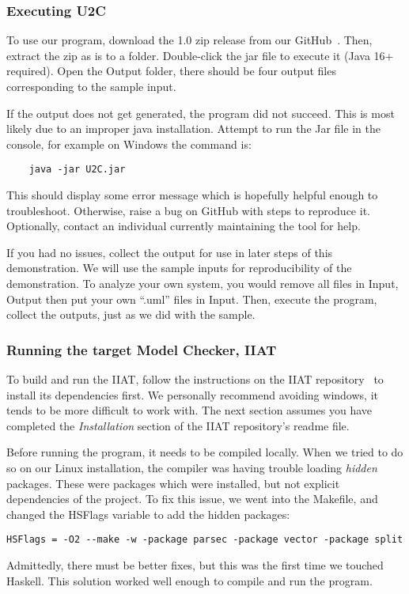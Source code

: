 \newpage
\subsubsection{Executing U2C}\label{subsubsec:exec}
To use our program, download the 1.0 zip release from our GitHub~\cite{repo_u2c}.
Then, extract the zip as is to a folder.
Double-click the jar file to execute it (Java 16+ required).
Open the Output folder, there should be four output files corresponding to the sample input.

If the output does not get generated, the program did not succeed.
This is most likely due to an improper java installation.
Attempt to run the Jar file in the console, for example on Windows the command is:
\begin{verbatim}
    java -jar U2C.jar
\end{verbatim}
This should display some error message which is hopefully helpful enough to troubleshoot.
Otherwise, raise a bug on GitHub with steps to reproduce it.
Optionally, contact an individual currently maintaining the tool for help.

If you had no issues, collect the output for use in later steps of this demonstration.
We will use the sample inputs for reproducibility of the demonstration.
To analyze your own system, you would remove all files in Input, Output then put your own ``.uml'' files in Input.
Then, execute the program, collect the outputs, just as we did with the sample.

\subsubsection{Running the target Model Checker, IIAT}\label{subsubsec:iiat-run}
To build and run the IIAT, follow the instructions on the IIAT repository~\cite{repo_iiat} to install its dependencies first.
We personally recommend avoiding windows, it tends to be more difficult to work with.
The next section assumes you have completed the \textit{Installation} section of the IIAT repository's readme file.

Before running the program, it needs to be compiled locally.
When we tried to do so on our Linux installation, the compiler was having trouble loading \textit{hidden} packages.
These were packages which were installed, but not explicit dependencies of the project.
To fix this issue, we went into the Makefile, and changed the HSFlags variable to add the hidden packages:
\begin{verbatim}HSFlags = -O2 --make -w -package parsec -package vector -package split\end{verbatim}
Admittedly, there must be better fixes, but this was the first time we touched Haskell.
This solution worked well enough to compile and run the program.

